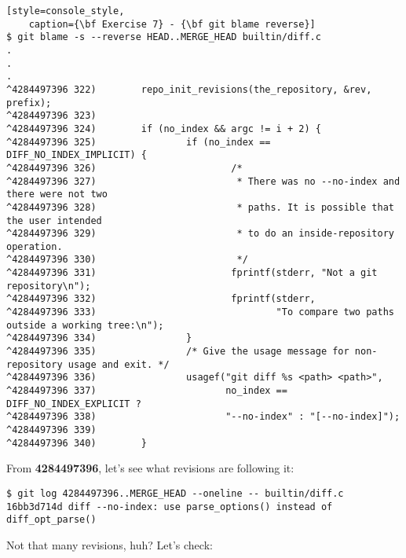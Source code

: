 \begin{lstlisting}[style=console_style,
	caption={\bf Exercise 7} - {\bf git blame reverse}]
$ git blame -s --reverse HEAD..MERGE_HEAD builtin/diff.c
.
.
.
^4284497396 322)        repo_init_revisions(the_repository, &rev, prefix);
^4284497396 323) 
^4284497396 324)        if (no_index && argc != i + 2) {
^4284497396 325)                if (no_index == DIFF_NO_INDEX_IMPLICIT) {
^4284497396 326)                        /*
^4284497396 327)                         * There was no --no-index and there were not two
^4284497396 328)                         * paths. It is possible that the user intended
^4284497396 329)                         * to do an inside-repository operation.
^4284497396 330)                         */
^4284497396 331)                        fprintf(stderr, "Not a git repository\n");
^4284497396 332)                        fprintf(stderr,
^4284497396 333)                                "To compare two paths outside a working tree:\n");
^4284497396 334)                }
^4284497396 335)                /* Give the usage message for non-repository usage and exit. */
^4284497396 336)                usagef("git diff %s <path> <path>",
^4284497396 337)                       no_index == DIFF_NO_INDEX_EXPLICIT ?
^4284497396 338)                       "--no-index" : "[--no-index]");
^4284497396 339) 
^4284497396 340)        }
\end{lstlisting}

From {\bf 4284497396}, let's see what revisions are following it:

\begin{lstlisting}[style=console_style,
	caption={\bf Exercise 7} - revisions to check]
$ git log 4284497396..MERGE_HEAD --oneline -- builtin/diff.c
16bb3d714d diff --no-index: use parse_options() instead of diff_opt_parse()
\end{lstlisting}

Not that many revisions, huh? Let's check:

